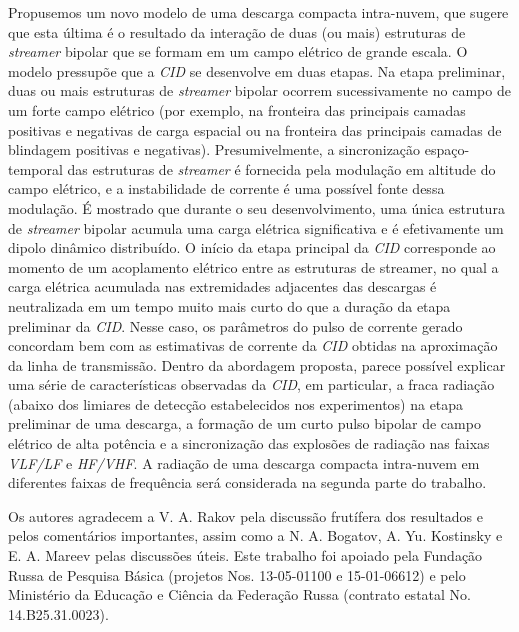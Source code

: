 \documentclass[a4paper, 12pt, onecolumn,singlespacing]{article}
\begin{document}
	Propusemos um novo modelo de uma descarga compacta intra-nuvem, que sugere que esta última é o resultado da interação de duas (ou mais) estruturas de \textit{streamer} bipolar que se formam em um campo elétrico de grande escala. O modelo pressupõe que a \textit{CID} se desenvolve em duas etapas. Na etapa preliminar, duas ou mais estruturas de \textit{streamer} bipolar ocorrem sucessivamente no campo de um forte campo elétrico (por exemplo, na fronteira das principais camadas positivas e negativas de carga espacial ou na fronteira das principais camadas de blindagem positivas e negativas). Presumivelmente, a sincronização espaço-temporal das estruturas de \textit{streamer} é fornecida pela modulação em altitude do campo elétrico, e a instabilidade de corrente é uma possível fonte dessa modulação. É mostrado que durante o seu desenvolvimento, uma única estrutura de \textit{streamer} bipolar acumula uma carga elétrica significativa e é efetivamente um dipolo dinâmico distribuído. O início da etapa principal da \textit{CID} corresponde ao momento de um acoplamento elétrico entre as estruturas de streamer, no qual a carga elétrica acumulada nas extremidades adjacentes das descargas é neutralizada em um tempo muito mais curto do que a duração da etapa preliminar da \textit{CID}. Nesse caso, os parâmetros do pulso de corrente gerado concordam bem com as estimativas de corrente da \textit{CID} obtidas na aproximação da linha de transmissão. Dentro da abordagem proposta, parece possível explicar uma série de características observadas da \textit{CID}, em particular, a fraca radiação (abaixo dos limiares de detecção estabelecidos nos experimentos) na etapa preliminar de uma descarga, a formação de um curto pulso bipolar de campo elétrico de alta potência e a sincronização das explosões de radiação nas faixas \textit{VLF/LF} e \textit{HF/VHF}. A radiação de uma descarga compacta intra-nuvem em diferentes faixas de frequência será considerada na segunda parte do trabalho.
	
	Os autores agradecem a V. A. Rakov pela discussão frutífera dos resultados e pelos comentários importantes, assim como a N. A. Bogatov, A. Yu. Kostinsky e E. A. Mareev pelas discussões úteis. Este trabalho foi apoiado pela Fundação Russa de Pesquisa Básica (projetos Nos. 13-05-01100 e 15-01-06612) e pelo Ministério da Educação e Ciência da Federação Russa (contrato estatal No. 14.B25.31.0023).
	
\end{document}

